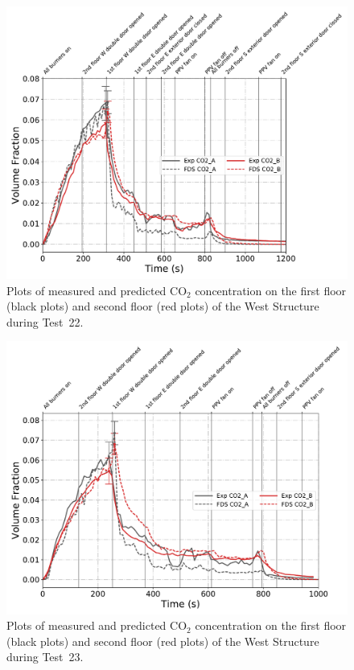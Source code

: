 \begin{figure}[!h]
	\centering
	\includegraphics[width=\columnwidth]{Figures/Plots/Validation/Gas_Concentration/Test_22_CO2}
	\caption[Plots of measured and predicted CO$_2$ concentration during Test~22.]{Plots of measured and predicted CO$_2$ concentration on the first floor (black plots) and second floor (red plots) of the West Structure during Test~22.}
	\label{fig:Test22_CO2}
\end{figure}

\begin{figure}[!h]
	\centering
	\includegraphics[width=\columnwidth]{Figures/Plots/Validation/Gas_Concentration/Test_23_CO2}
	\caption[Plots of measured and predicted CO$_2$ concentration during Test~23.]{Plots of measured and predicted CO$_2$ concentration on the first floor (black plots) and second floor (red plots) of the West Structure during Test~23.}
	\label{fig:Test23_CO2}
\end{figure}

